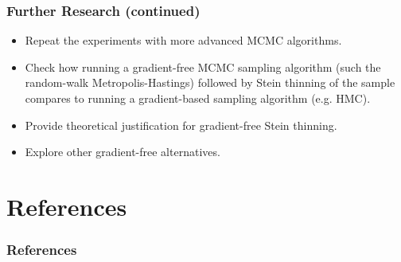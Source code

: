 \documentclass{beamer}
\begin{document}
\begin{frame}
\frametitle{Further Research (continued)}

\begin{itemize}

\item Repeat the experiments with more advanced MCMC algorithms. 

\item Check how running a gradient-free MCMC sampling algorithm (such the random-walk Metropolis-Hastings) followed by Stein thinning of the sample compares to running a gradient-based sampling algorithm (e.g. HMC).

\item Provide theoretical justification for gradient-free Stein thinning.

\item Explore other gradient-free alternatives.

\end{itemize}

\end{frame}

\section{References}

\begin{frame}[allowframebreaks]
\frametitle{References}

\fontsize{10pt}{12}\selectfont




\end{frame}
\end{document}
